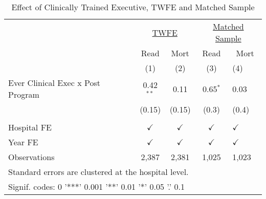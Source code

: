 \begin{table}[ht!]

\caption{\label{tab:main_twfe_match}Effect of Clinically Trained Executive, TWFE and Matched Sample}
\centering
\begin{tabular}[t]{lcccl}
\toprule
\multicolumn{1}{c}{\underline{ }} & \multicolumn{2}{c}{\underline{TWFE}} & \multicolumn{2}{c}{\underline{Matched Sample}} \\
\cmidrule(l{3pt}r{3pt}){2-3} \cmidrule(l{3pt}r{3pt}){4-5}
\multicolumn{1}{c}{ } & \multicolumn{1}{c}{Read} & \multicolumn{1}{c}{Mort} & \multicolumn{1}{c}{Read} & \multicolumn{1}{c}{Mort} \\
\cmidrule(l{3pt}r{3pt}){2-2} \cmidrule(l{3pt}r{3pt}){3-3} \cmidrule(l{3pt}r{3pt}){4-4} \cmidrule(l{3pt}r{3pt}){5-5}
 & (1) & (2) & (3) & (4)\\
\midrule
Ever Clinical Exec x Post Program & 0.42$^{**}$ & 0.11 & 0.65$^{*}$ & 0.03\\
 & (0.15) & (0.15) & (0.3) & (0.4)\\
 &  &  &  & \\
Hospital FE & $\checkmark$ & $\checkmark$ & $\checkmark$ & $\checkmark$\\
Year FE & $\checkmark$ & $\checkmark$ & $\checkmark$ & $\checkmark$\\
\addlinespace
Observations & 2,387 & 2,381 & 1,025 & 1,023\\
\bottomrule
\multicolumn{5}{l}{\textsuperscript{} Standard errors are clustered at the hospital level.}\\
\multicolumn{5}{l}{\textsuperscript{} Signif. codes: 0 '***' 0.001 '**' 0.01 '*' 0.05 '.' 0.1}\\
\end{tabular}
\end{table}
